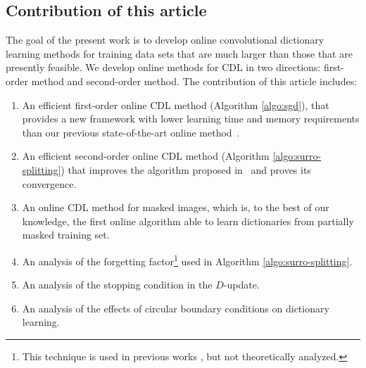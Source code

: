 \documentclass[final]{siamart1116}
\begin{document}
\subsection{Contribution of this article}

The goal of the present work is to develop online convolutional dictionary learning methods for training data sets that are much larger than those that are presently feasible.  We develop online methods for CDL in two directions: first-order method and second-order method. The contribution of this article includes:
\begin{enumerate}
\item An efficient first-order online CDL method (Algorithm \ref{algo:sgd}), that provides a new framework with lower learning time and memory requirements than our previous state-of-the-art online method~\cite{liu-2017-online}.
\item An efficient second-order online CDL method (Algorithm
  \ref{algo:surro-splitting}) that improves the algorithm proposed
  in~\cite{liu-2017-online} and proves its convergence.
\item An online CDL method for masked images, which is, to the best of our knowledge, the first online algorithm able to learn dictionaries from partially masked training set.
\item An analysis of the forgetting factor\footnote{This technique is used in previous works \cite{skretting-2010-recursive, mairal-2010-online, szabo2011online, slavakis2014online}, but not theoretically analyzed.} used in Algorithm \ref{algo:surro-splitting}.
\item An analysis of the stopping condition in the $D$-update.
\item An analysis of the effects of circular boundary conditions on dictionary learning.
\end{enumerate}
\end{document}
